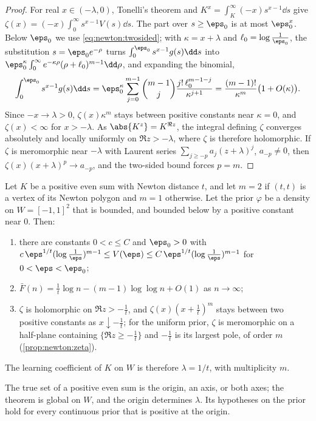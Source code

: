\begin{refsection}
\begin{proof}
For real $x\in(-\lambda,0)$, Tonelli's theorem and $K^x=\int_K^\infty(-x)s^{x-1}\dd s$ give $\zeta(x)=(-x)\int_0^\infty s^{x-1}V(s)\dd s$. The part over $s\ge\eps_0$ is at most $\eps_0^x$. Below $\eps_0$ we use \eqref{eq:newton:twosided}; with $\kappa=x+\lambda$ and $\ell_0=\log\frac1{\eps_0}$, the substitution $s=\eps_0e^{-\rho}$ turns $\int_0^{\eps_0}s^{x-1}g(s)\dd s$ into $\eps_0^\kappa\int_0^\infty e^{-\kappa\rho}(\rho+\ell_0)^{m-1}\dd\rho$, and expanding the binomial,
\[
\int_0^{\eps_0}s^{x-1}g(s)\dd s=\eps_0^\kappa\sum_{j=0}^{m-1}\binom{m-1}j\frac{j!\,\ell_0^{m-1-j}}{\kappa^{j+1}}=\frac{(m-1)!}{\kappa^m}\bigl(1+O(\kappa)\bigr).
\]
Since $-x\to\lambda>0$, $\zeta(x)\kappa^m$ stays between positive constants near $\kappa=0$, and $\zeta(x)<\infty$ for $x>-\lambda$. As $\abs{K^z}=K^{\Re z}$, the integral defining $\zeta$ converges absolutely and locally uniformly on $\Re z>-\lambda$, where $\zeta$ is therefore holomorphic. If $\zeta$ is meromorphic near $-\lambda$ with Laurent series $\sum_{j\ge-p}a_j(z+\lambda)^j$, $a_{-p}\ne0$, then $\zeta(x)(x+\lambda)^p\to a_{-p}$, and the two-sided bound forces $p=m$.
\end{proof}

\begin{theorem}\label{thm:newton:plane}
Let $K$ be a positive even sum with Newton distance $t$, and let $m=2$ if $(t,t)$ is a vertex of its Newton polygon and $m=1$ otherwise. Let the prior $\varphi$ be a density on $W=[-1,1]^2$ that is bounded, and bounded below by a positive constant near $0$. Then:
\begin{enumerate}
\item there are constants $0<c\le C$ and $\eps_0>0$ with $c\,\eps^{1/t}(\log\frac1\eps)^{m-1}\le V(\eps)\le C\,\eps^{1/t}(\log\frac1\eps)^{m-1}$ for $0<\eps<\eps_0$;
\item $\bar F(n)=\frac1t\log n-(m-1)\log\log n+O(1)$ as $n\to\infty$;
\item $\zeta$ is holomorphic on $\Re z>-\frac1t$, and $\zeta(x)(x+\frac1t)^m$ stays between two positive constants as $x\downarrow-\frac1t$; for the uniform prior, $\zeta$ is meromorphic on a half-plane containing $\{\Re z\ge-\frac1t\}$ and $-\frac1t$ is its largest pole, of order $m$ (\cref{prop:newton:zeta}).
\end{enumerate}
The learning coefficient of $K$ on $W$ is therefore $\lambda=1/t$, with multiplicity $m$.
\end{theorem}

The true set of a positive even sum is the origin, an axis, or both axes; the theorem is global on $W$, and the origin determines $\lambda$. Its hypotheses on the prior hold for every continuous prior that is positive at the origin.


\end{refsection}
